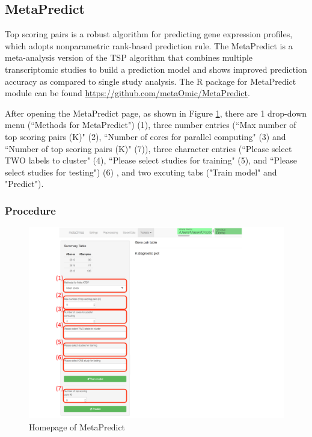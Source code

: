 \subsection{MetaPredict}

Top scoring pairs is a robust algorithm for predicting gene expression profiles,
which adopts nonparametric rank-based prediction rule.
The MetaPredict is a meta-analysis version of the TSP algorithm that combines multiple transcriptomic studies to build a prediction model and shows improved 
prediction accuracy as compared to single study analysis.
The R package for MetaPredict module can be found \url{https://github.com/metaOmic/MetaPredict}.

After opening the MetaPredict page, as shown in Figure \ref{fig:MetaPredictmainpage}, there are 1 drop-down menu (``Methods for MetaPredict") {\color{red} (1)}, three number entries (``Max number of top scoring pairs (K)" {\color{red} (2)}, ``Number of cores for parallel computing" {\color{red} (3)} and ``Number of top scoring pairs (K)" {\color{red} (7)}), three character entries (``Please select TWO labels to cluster" {\color{red} (4)}, ``Please select studies for training" {\color{red} (5)}, and ``Please select studies for testing") {\color{red} (6)} , and two excuting tabs ("Train model" and "Predict"). 

\subsubsection{Procedure}

\begin{figure}[H]
\begin{center}
\includegraphics[scale=0.7]{./figure/MetaPredict/MetaPredictprocedure}
\caption{Homepage of MetaPredict}
\label{fig:MetaPredictmainpage}
\end{center}
\end{figure}

